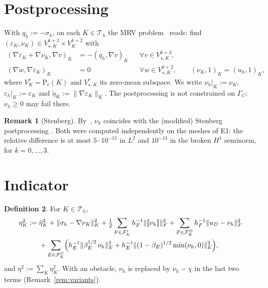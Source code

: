 \documentclass[11pt,a4paper]{article}
\theoremstyle{definition}
\newtheorem{definition}{Definition}[section]
\newtheorem{remark}[definition]{Remark}
\newcommand{\Pk}[1]{\mathrm{P}_{#1}}
\newcommand{\jmp}[1]{[\![#1]\!]}
\newcommand{\Th}{\mathcal{T}_h}
\begin{document}
\section{Postprocessing}

With $q_h:=-\sigma_h$, on each $K\in\Th$ the MRV problem~\cite[(3.2)]{mrv} reads: find
$(\varepsilon_K,\nu_K)\in V^{k+3}_{\star,K}\times V^{k+2}_K$ with
\begin{equation}\label{eq:mrv}
\begin{aligned}
  (\nabla\varepsilon_K+\nabla\nu_K,\nabla v)_K&=-(q_h,\nabla v)_K &&\forall v\in V^{k+3}_{\star,K},\\
  (\nabla w,\nabla\varepsilon_K)_K&=0 &&\forall w\in V^{k+2}_{\star,K},\qquad (\nu_K,1)_K=(u_h,1)_K,
\end{aligned}
\end{equation}
where $V^r_K=\Pk{r}(K)$ and $V^r_{\star,K}$ its zero-mean subspace. We write $\nu_h|_K:=\nu_K$,
$\varepsilon_h|_K:=\varepsilon_K$ and $\tilde\eta_K:=\|\nabla\varepsilon_K\|_K$. The
postprocessing is not constrained on $\Gamma_C$: $\nu_h\ge0$ may fail there.

\begin{remark}[Stenberg]
By~\cite[Prop.~3.1]{mrv}, $\nu_h$ coincides with the (modified) Stenberg postprocessing
\cite[(2.10)]{mrv}. Both were computed independently on the meshes of E1: the relative difference is
at most $5\cdot10^{-15}$ in $L^2$ and $10^{-13}$ in the broken $H^1$ seminorm, for $k=0,\dots,3$.
\end{remark}

\section{Indicator}

\begin{definition}\label{def:eta}
For $K\in\Th$,
\begin{align*}
  \eta_K^2:={}& \tilde\eta_K^2+\|\sigma_h-\nabla\nu_K\|_K^2
   +\tfrac12\sum_{F\in\mathcal{F}^i_K}h_F^{-1}\|\jmp{\nu_h}\|_F^2
   +\sum_{F\in\mathcal{F}^D_K}h_F^{-1}\|u_D-\nu_h\|_F^2 \\
  &+\sum_{E\in\mathcal{F}^C_K}\Bigl(h_E^{-1}\|\beta_E^{1/2}\,\nu_h\|_E^2
     +h_E^{-1}\|(1-\beta_E)^{1/2}\min(\nu_h,0)\|_E^2\Bigr),
\end{align*}
and $\eta^2:=\sum_K\eta_K^2$. With an obstacle, $\nu_h$ is replaced by $\nu_h-\chi$ in the last two
terms (Remark~\ref{rem:variants}).
\end{definition}
\end{document}
